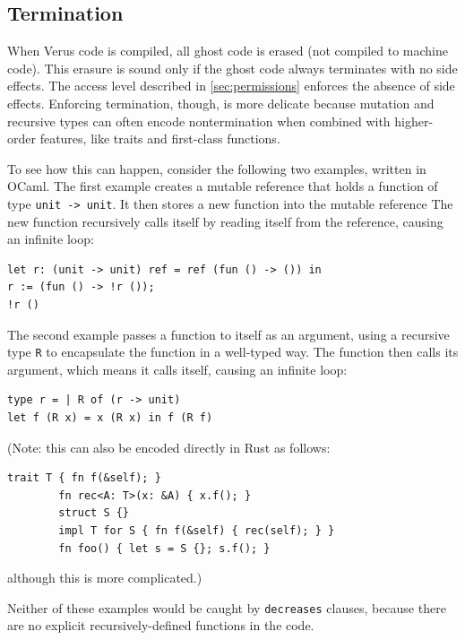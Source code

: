 \subsection{Termination} \label{sec:termination}

When Verus code is compiled,
all ghost code is erased (not compiled to machine code).
This erasure is sound only if the ghost code always terminates with no side effects.
The access level described in \autoref{sec:permissions} enforces the absence of side effects.
Enforcing termination, though, is more delicate because
mutation and recursive types can often encode nontermination
when combined with higher-order features,
like traits and first-class functions.

To see how this can happen, consider the following two examples, written in OCaml.
The first example creates a mutable reference that holds a function of type \verb`unit -> unit`.
It then stores a new function into the mutable reference
The new function recursively calls itself by reading itself from the reference,
causing an infinite loop:

\begin{lstlisting}
let r: (unit -> unit) ref = ref (fun () -> ()) in
r := (fun () -> !r ());
!r ()
\end{lstlisting}

The second example passes a function to itself as an argument,
using a recursive type \verb`R` to encapsulate the function in a well-typed way.
The function then calls its argument, which means it calls itself,
causing an infinite loop:

\begin{lstlisting}
type r = | R of (r -> unit)
let f (R x) = x (R x) in f (R f)
\end{lstlisting}

\noindent(Note: this can also be encoded directly in Rust as follows:
\begin{lstlisting}[language=Verus]
        trait T { fn f(&self); }
        fn rec<A: T>(x: &A) { x.f(); }
        struct S {}
        impl T for S { fn f(&self) { rec(self); } }
        fn foo() { let s = S {}; s.f(); }
\end{lstlisting}
although this is more complicated.)

Neither of these examples would be caught by \verb`decreases` clauses,
because there are no explicit recursively-defined functions in the code.

